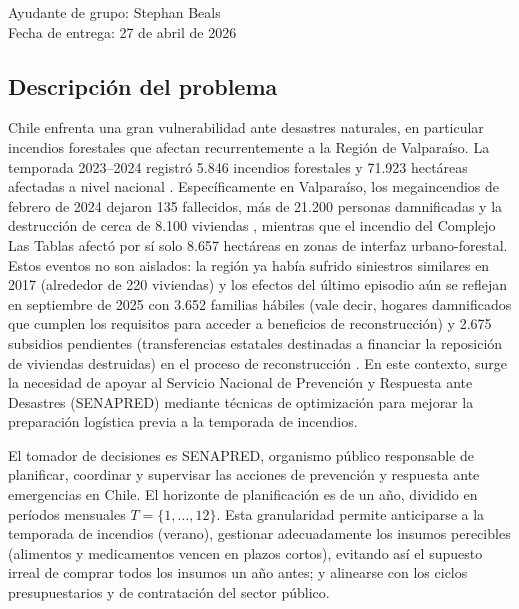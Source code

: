 \documentclass[letterpaper]{article}
\begin{document}
\vspace*{5mm}
{\large Ayudante de grupo: Stephan Beals\\}
{\large Fecha de entrega: 27 de abril de 2026\\}


\newpage
\begin{flushleft}
\tableofcontents
\end{flushleft}

\newpage
\begin{flushleft}
\end{flushleft}

\begin{flushleft}

\section{Descripción del problema}

Chile enfrenta una gran vulnerabilidad ante desastres naturales, en particular incendios forestales que afectan recurrentemente a la Región de Valparaíso. La temporada 2023--2024 registró 5.846 incendios forestales y 71.923 hectáreas afectadas a nivel nacional \cite{conaf2024}. Específicamente en Valparaíso, los megaincendios de febrero de 2024 dejaron 135 fallecidos, más de 21.200 personas damnificadas y la destrucción de cerca de 8.100 viviendas \cite{minds2024plan}, mientras que el incendio del Complejo Las Tablas afectó por sí solo 8.657 hectáreas en zonas de interfaz urbano-forestal. Estos eventos no son aislados: la región ya había sufrido siniestros similares en 2017 (alrededor de 220 viviendas) y los efectos del último episodio aún se reflejan en septiembre de 2025 con 3.652 familias hábiles (vale decir, hogares damnificados que cumplen los requisitos para acceder a beneficios de reconstrucción) y 2.675 subsidios pendientes (transferencias estatales destinadas a financiar la reposición de viviendas destruidas) en el proceso de reconstrucción \cite{minvu2025}. En este contexto, surge la necesidad de apoyar al Servicio Nacional de Prevención y Respuesta ante Desastres (SENAPRED) mediante técnicas de optimización para mejorar la preparación logística previa a la temporada de incendios.

El tomador de decisiones es SENAPRED, organismo público responsable de planificar, coordinar y supervisar las acciones de prevención y respuesta ante emergencias en Chile. El horizonte de planificación es de un año, dividido en períodos mensuales $T = \{1,\dots,12\}$. Esta granularidad permite anticiparse a la temporada de incendios (verano), gestionar adecuadamente los insumos perecibles (alimentos y medicamentos vencen en plazos cortos), evitando así el supuesto irreal de comprar todos los insumos un año antes; y alinearse con los ciclos presupuestarios y de contratación del sector público.


\end{flushleft}
\end{document}
